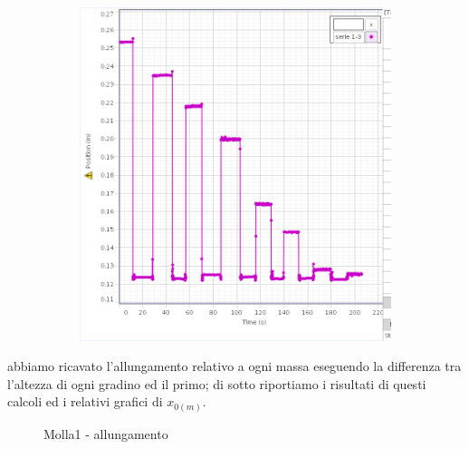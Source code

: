 \documentclass[a4paper]{article}
\theoremstyle{definition}
\begin{document}
\begin{figure}[!htbp]
{{			\begin{subfigure}{0.5\textwidth}
				\includegraphics[scale=0.35]{capstone_data/statica/serie.png}
			\end{subfigure}%
		}
	}
\end{figure}
\noindent abbiamo ricavato l'allungamento relativo a ogni massa eseguendo la differenza tra l'altezza di ogni gradino ed il primo; di sotto riportiamo i risultati di questi calcoli ed i relativi grafici di \(x_{0(m)}\).
\begin{figure}[!htbp]
	\captionsetup{labelformat=empty}
	\caption{Molla1 - allungamento}
\end{figure}
	
\end{document}
